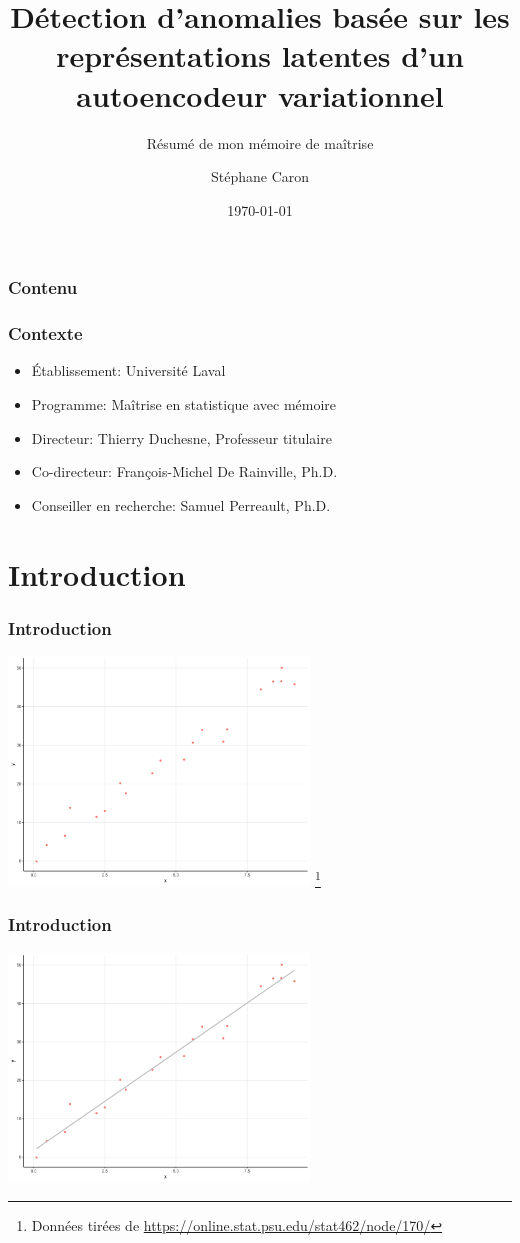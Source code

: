 \documentclass{beamer}
\title{Détection d’anomalies basée sur les représentations latentes d’un autoencodeur variationnel}
\subtitle{Résumé de mon mémoire de maîtrise}
\author{Stéphane Caron}
\institute{Université Laval}
\date{\today}
\newcommand\blfootnote[1]{%
	\begingroup
	\renewcommand\thefootnote{}\footnote{#1}%
	\addtocounter{footnote}{-1}%
	\endgroup
}
\begin{document}
	
	\begin{frame}
		\titlepage
	\end{frame}

	\begin{frame}
		\frametitle{Contenu}
		\tableofcontents
	\end{frame}


	\begin{frame}
		\frametitle{Contexte}
		
		\begin{itemize}
			\item Établissement: Université Laval
			\item Programme: Maîtrise en statistique avec mémoire
			\item Directeur: Thierry Duchesne, Professeur titulaire
			\item Co-directeur: François-Michel De Rainville, Ph.D.
			\item Conseiller en recherche: Samuel Perreault, Ph.D.
		\end{itemize}
	\end{frame}

	\section{Introduction}
	
	\begin{frame}
		\frametitle{Introduction}
		\centering
		\includegraphics[width=8cm]{images/plot1}
		\blfootnote{Données tirées de \url{https://online.stat.psu.edu/stat462/node/170/}}
	\end{frame}

	\begin{frame}
		\frametitle{Introduction}
		\centering
		\includegraphics[width=8cm]{images/plot2}
	\end{frame}
	
\end{document}
